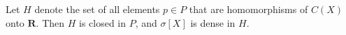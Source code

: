 Let $H$ denote the set of all elements $p \in P$ that are homomorphisms of $C(X)$ onto $\mathbf{R}$. Then $H$ is closed in $P$, and $\sigma[X]$ is dense in $H$.
